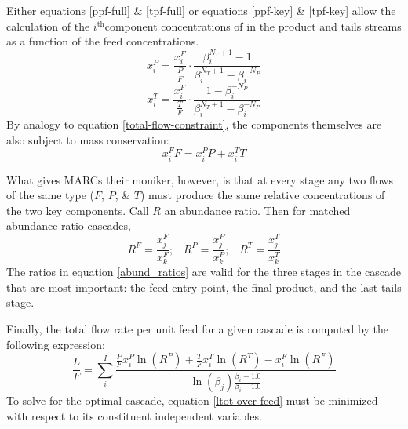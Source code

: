 \documentclass[preprint,12pt]{elsarticle}
\newcommand{\superscript}[1]{\ensuremath{^{\textrm{#1}}}}
\newcommand{\ith}[0]{$i$\superscript{th}}
\begin{document}
Either equations \ref{ppf-full} \& \ref{tpf-full} or equations \ref{ppf-key} \& 
\ref{tpf-key} allow the calculation of the \ith component concentrations of in the 
product and tails streams as a function of the feed concentrations.
\begin{equation}
x_i^P = \frac{x_i^F}{\frac{P}{F}}\cdot\frac{\beta_i^{N_T+1} - 1}
                                           {\beta_i^{N_T+1} - \beta_i^{-N_P}}
\label{prod-concentration}
\end{equation}
\begin{equation}
x_i^T = \frac{x_i^F}{\frac{T}{F}}\cdot\frac{1 - \beta_i^{-N_P}}
                                           {\beta_i^{N_T+1} - \beta_i^{-N_P}}
\label{tail-concentration}
\end{equation}
By analogy to equation \ref{total-flow-constraint}, the components themselves are
also subject to mass conservation:
\begin{equation}
x_i^FF = x_i^PP + x_i^TT
\label{comp-flow-constraint}
\end{equation}

What gives MARCs their moniker, however, is that at every stage any two flows of 
the same type ($F$, $P$, \& $T$) must produce the same relative concentrations of 
the two key components.  Call $R$ an abundance ratio.  Then for matched abundance 
ratio cascades, 
\begin{equation}
R^F = \frac{x_j^F}{x_k^F}; \;\;\; R^P = \frac{x_j^P}{x_k^P}; \;\;\; 
R^T = \frac{x_j^T}{x_k^T}
\label{abund_ratios}
\end{equation}
The ratios in equation \ref{abund_ratios} are valid for the three stages in the 
cascade that are most important: the feed entry point, the final product, and the 
last tails stage.

Finally, the total flow rate per unit feed for a given cascade is computed by 
the following expression:
\begin{equation}
\frac{L}{F} = \sum_i^I \frac{\frac{P}{F}x_i^P\ln(R^P) + \frac{T}{F}x_i^T\ln(R^T) 
                                                      - x_i^F\ln(R^F)}
                            {\ln(\beta_j)\frac{\beta_i - 1.0}{\beta_i + 1.0}}
\label{ltot-over-feed}
\end{equation}
To solve for the optimal cascade, equation \ref{ltot-over-feed} must be minimized
with respect to its constituent independent variables.
\end{document}

